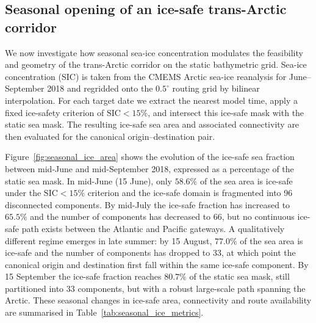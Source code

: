 \subsection{Seasonal opening of an ice-safe trans-Arctic corridor}
\label{sec:results_seasonal_ice}

We now investigate how seasonal sea-ice concentration modulates the feasibility
and geometry of the trans-Arctic corridor on the static bathymetric grid.
Sea-ice concentration (SIC) is taken from the CMEMS Arctic sea-ice reanalysis
for June--September 2018 and regridded onto the $0.5^{\circ}$ routing grid by
bilinear interpolation. For each target date we extract the nearest model time,
apply a fixed ice-safety criterion of $\mathrm{SIC}<15\%$, and intersect this
ice-safe mask with the static sea mask. The resulting ice-safe sea area and
associated connectivity are then evaluated for the canonical origin--destination
pair.

Figure~\ref{fig:seasonal_ice_area} shows the evolution of the ice-safe sea
fraction between mid-June and mid-September 2018, expressed as a percentage of
the static sea mask. In mid-June (15 June), only $58.6\%$ of the sea area is
ice-safe under the $\mathrm{SIC}<15\%$ criterion and the ice-safe domain is
fragmented into 96 disconnected components. By mid-July the ice-safe fraction
has increased to $65.5\%$ and the number of components has decreased to 66, but
no continuous ice-safe path exists between the Atlantic and Pacific gateways.
A qualitatively different regime emerges in late summer: by 15 August,
$77.0\%$ of the sea area is ice-safe and the number of components has dropped
to 33, at which point the canonical origin and destination first fall within
the same ice-safe component. By 15 September the ice-safe fraction reaches
$80.7\%$ of the static sea mask, still partitioned into 33 components, but with
a robust large-scale path spanning the Arctic.
These seasonal changes in ice-safe area, connectivity and route availability
are summarised in Table~\ref{tab:seasonal_ice_metrics}.

